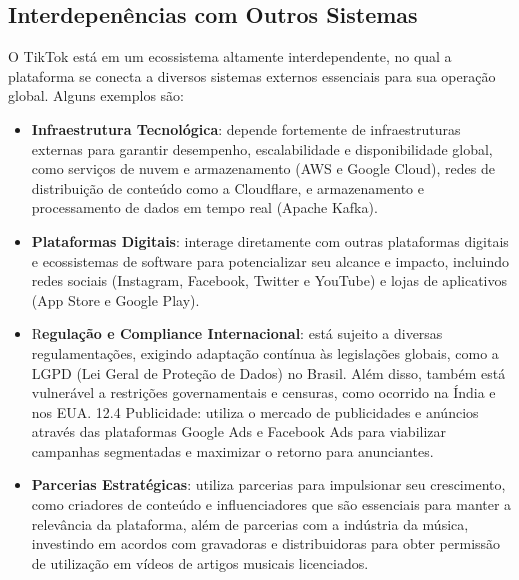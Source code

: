 \subsection{Interdepenências com Outros Sistemas}

O TikTok está em um ecossistema altamente interdependente, no qual a plataforma se conecta a diversos sistemas externos essenciais para sua operação global. Alguns exemplos são:

\begin{itemize}
\item \textbf{Infraestrutura Tecnológica}: depende fortemente de infraestruturas externas para garantir desempenho, escalabilidade e disponibilidade global, como serviços de nuvem e armazenamento (AWS e Google Cloud), redes de distribuição de conteúdo como a Cloudflare, e armazenamento e processamento de dados em tempo real (Apache Kafka).

\item \textbf{Plataformas Digitais}: interage diretamente com outras plataformas digitais e ecossistemas de software para potencializar seu alcance e impacto, incluindo redes sociais (Instagram, Facebook, Twitter e YouTube) e lojas de aplicativos (App Store e Google Play).

\item R\textbf{egulação e Compliance Internacional}: está sujeito a diversas regulamentações, exigindo adaptação contínua às legislações globais, como a LGPD (Lei Geral de Proteção de Dados) no Brasil. Além disso, também está vulnerável a restrições governamentais e censuras, como ocorrido na Índia e nos EUA.
12.4 Publicidade: utiliza o mercado de publicidades e anúncios através das plataformas Google Ads e Facebook Ads para viabilizar campanhas segmentadas e maximizar o retorno para anunciantes.

\item \textbf{Parcerias Estratégicas}: utiliza parcerias para impulsionar seu crescimento, como criadores de conteúdo e influenciadores que são essenciais para manter a relevância da plataforma, além de parcerias com a indústria da música, investindo em acordos com gravadoras e distribuidoras para obter permissão de utilização em vídeos de artigos musicais licenciados.
\end{itemize}